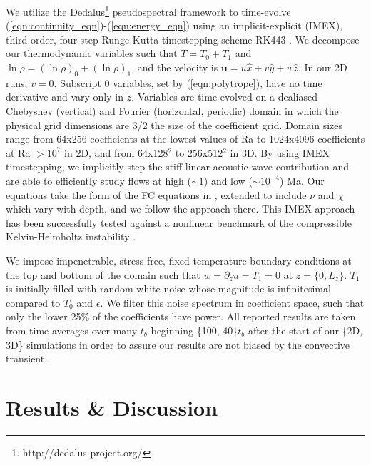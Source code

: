\documentclass[aps, prl, twocolumn, nofootinbib, groupedaddress, amsfonts, amssymb, amsmath]{revtex4-1}
\begin{document}
We utilize the 
Dedalus\footnote{http://dedalus-project.org/} \cite{burns&all2016} 
pseudospectral framework to time-evolve  
(\ref{eqn:continuity_eqn})-(\ref{eqn:energy_eqn}) 
using an implicit-explicit (IMEX), third-order, four-step 
Runge-Kutta timestepping scheme RK443 \cite{ascher&all1997}.  
We decompose our thermodynamic variables such that $T = T_0 + T_1$ and
$\ln\rho = (\ln\rho)_0 + (\ln\rho)_1$, 
and the velocity is $\bm{u} = u\hat{x} + v\hat{y} +  w\hat{z}$.
In our 2D runs, $v = 0$.
Subscript 0 variables, set by (\ref{eqn:polytrope}), 
have no time derivative and vary only in $z$.
Variables are time-evolved on a dealiased Chebyshev (vertical)
and Fourier (horizontal, periodic) domain in which the
physical grid dimensions are 3/2 the size of the coefficient grid.  
Domain sizes range from
64x256 coefficients at the lowest values of 
Ra to 1024x4096 coefficients at Ra $> 10^{7}$ in 2D,
and from 64x128$^2$ to  256x512$^2$ in 3D. 
By using IMEX timestepping, we implicitly step the 
stiff linear acoustic wave contribution and are able to
efficiently study flows at high ($\sim 1$) 
and low ($\sim 10^{-4}$) Ma.  Our equations take the form
of the FC equations in \cite{lecoanet&all2014}, extended to include
$\nu$ and $\chi$ which vary with depth, and we follow the approach there.
This IMEX approach has been successfully 
tested against a nonlinear benchmark  of the compressible 
Kelvin-Helmholtz instability \cite{Lecoanet_et_al_2016_KH}.

We impose impenetrable, stress free, fixed temperature boundary conditions at
the top and bottom of the domain such that 
$w = \partial_z u = T_1 = 0$ at $z = \{0, L_z\}$. 
$T_1$ is initially filled with
random white noise whose magnitude is infinitesimal
compared to $T_0$ and $\epsilon$.
We filter this noise spectrum in coefficient space, 
such that only the lower 25\% of the coefficients
have power. All reported results are taken from time averages
over many $t_b$ beginning \{100, 40\}$t_b$
after the start of our \{2D, 3D\} simulations in order to
assure our results are not biased by the convective transient.

\section{Results \& Discussion}
\label{sec:results}
\end{document}
